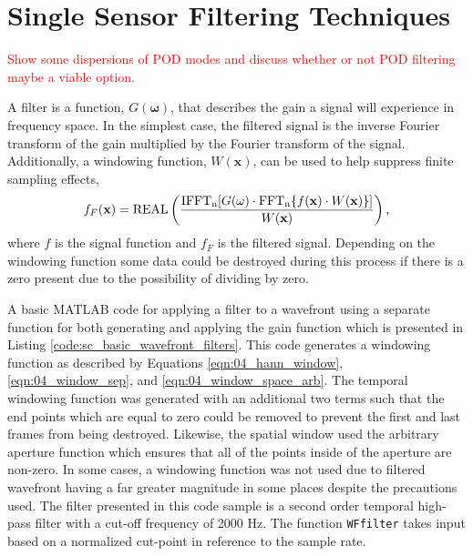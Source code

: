
\chapter{Single Sensor Filtering Techniques}
\label{chap:06}

\textcolor{red}{Show some dispersions of POD modes and discuss whether or not POD filtering maybe a viable option.}

A filter is a function, $G(\mathbf{\omega})$, that describes the gain a signal will experience in frequency space.
In the simplest case, the filtered signal is the inverse Fourier transform of the gain multiplied by the Fourier transform of the signal.
Additionally, a windowing function, $W(\mathbf{x})$, can be used to help suppress finite sampling effects,
\begin{equation}
 f_F(\mathbf{x}) = \operatorname{REAL}\left(\frac{\operatorname{IFFT_n}[G(\mathbf{\omega})\cdot\operatorname{FFT_n}\{f(\mathbf{x})\cdot W(\mathbf{x})\}]}{W(\mathbf{x})}\right) \textrm{,}
 \label{eqn:06_filter_function}
\end{equation}
where $f$ is the signal function and $f_F$ is the filtered signal.
Depending on the windowing function some data could be destroyed during this process if there is a zero present due to the possibility of dividing by zero.

A basic MATLAB code for applying a filter to a wavefront using a separate function for both generating and applying the gain function which is presented in Listing \ref{code:sc_basic_wavefront_filters}.
This code generates a windowing function as described by Equations \ref{eqn:04_hann_window}, \ref{eqn:04_window_sep}, and \ref{eqn:04_window_space_arb}.
The temporal windowing function was generated with an additional two terms such that the end points which are equal to zero could be removed to prevent the first and last frames from being destroyed.
Likewise, the spatial window used the arbitrary aperture function which ensures that all of the points inside of the aperture are non-zero.
In some cases, a windowing function was not used due to filtered wavefront having a far greater magnitude in some places despite the precautions used.
The filter presented in this code sample is a second order temporal high-pass filter with a cut-off frequency of 2000 Hz.
The function \lstinline{WFfilter} takes input based on a normalized cut-point in reference to the sample rate.

